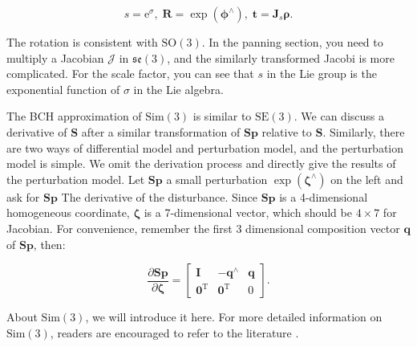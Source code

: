 \begin{equation}
s=\mathrm{e}^\sigma, \; \bm{R} = \exp( \boldsymbol{\phi} ^\wedge), \; \bm{t} = \bm{J}_s \boldsymbol{\rho}.
\end{equation}

The rotation is consistent with $\mathrm{SO}(3)$. In the panning section, you need to multiply a Jacobian $\bm{\mathcal{J}}$ in $\mathfrak{se}(3)$, and the similarly transformed Jacobi is more complicated. For the scale factor, you can see that $s$ in the Lie group is the exponential function of $\sigma$ in the Lie algebra.

The BCH approximation of $\mathrm{Sim}(3)$ is similar to $\mathrm{SE}(3)$. We can discuss a derivative of $\bm{S}$ after a similar transformation of $\bm{S} \bm{p}$ relative to $\bm{S}$. Similarly, there are two ways of differential model and perturbation model, and the perturbation model is simple. We omit the derivation process and directly give the results of the perturbation model. Let $\bm{S} \bm{p}$ a small perturbation $\exp( \boldsymbol{\zeta} ^\wedge )$ on the left and ask for $\bm{S} \bm{p}$ The derivative of the disturbance. Since $\bm{S} \bm{p}$ is a 4-dimensional homogeneous coordinate, $\boldsymbol{\zeta}$ is a 7-dimensional vector, which should be $4 \times 7$ for Jacobian. For convenience, remember the first 3 dimensional composition vector $\bm{q}$ of $\bm{Sp}$, then:

\begin{equation}
\frac{{\partial \bm{Sp}}}{{\partial \boldsymbol{\zeta} }} = \left[ {\begin{array}{*{20}{c}}
	\bm{I} &{ - {\bm{q}^ \wedge }}& \bm{q} \\
	{{\bm{0}^\mathrm{T}}} & {{ \bm{0}^\mathrm{T}}}&0
	\end{array}} \right].
\end{equation}

About $\mathrm{Sim}(3)$, we will introduce it here. For more detailed information on $\mathrm{Sim}(3)$, readers are encouraged to refer to the literature \cite{Strasdat2012a}.